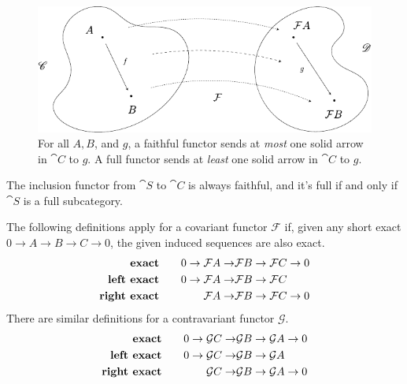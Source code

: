\documentclass[twoside,10pt]{report}
\begin{document}
\begin{figure}[H]
	\centering
	\includegraphics[scale=1]{fig/faith-full.pdf}
	\caption{For all $A, B$, and $g$, a faithful functor sends at \textit{most} one solid arrow in $\cat{C}$ to $g$. A full functor sends at \textit{least} one solid arrow in $\cat{C}$ to $g$.}
\end{figure}

\begin{ex}
The inclusion functor from $\cat{S}$ to $\cat{C}$ is always faithful, and it's full if and only if $\cat{S}$ is a full subcategory.
\end{ex}

\begin{defn}[]
The following definitions apply for a covariant functor $\mathcal{F}$ if, given any short exact $0\to A\to B\to C\to 0$, the given induced sequences are also exact.
\begin{equation*}
        \begin{aligned}[c]
                \text{\textbf{exact}} \\
                \text{\textbf{left exact}} \\
                \text{\textbf{right exact}}
        \end{aligned}
        \qquad
        \begin{aligned}[c]
                0\to \mathcal{F}A\to &\mathcal{F}B\to \mathcal{F}C\to 0\\
                0\to \mathcal{F}A\to &\mathcal{F}B\to \mathcal{F}C\\
                \mathcal{F}A\to &\mathcal{F}B\to \mathcal{F}C\to 0
        \end{aligned}
\end{equation*}
There are similar definitions for a contravariant functor $\mathcal{G}$.
\begin{equation*}
        \begin{aligned}[c]
                \text{\textbf{exact}} \\
                \text{\textbf{left exact}} \\
                \text{\textbf{right exact}}
        \end{aligned}
        \qquad
        \begin{aligned}[c]
                0\to \mathcal{G}C\to &\mathcal{G}B\to \mathcal{G}A\to 0\\
                0\to \mathcal{G}C\to &\mathcal{G}B\to \mathcal{G}A\\
                \mathcal{G}C\to &\mathcal{G}B\to \mathcal{G}A\to 0
        \end{aligned}
\end{equation*}
\end{defn}
\end{document}
